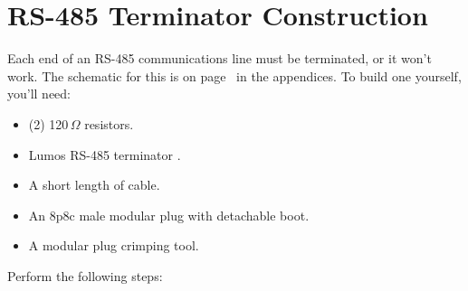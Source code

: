 \documentclass[letterpaper,twoside,onecolumn,openright,final]{memoir}
\begin{document}
\section{RS-485 Terminator Construction}\label{sec:terminator}
Each end of an RS-485 communications line must be terminated, or it won't work.
The schematic for this is on page~\pageref{sch:terminator} in the 
appendices.  To build one yourself, you'll need:
\begin{itemize}
\item	(2) 120\,$\Omega$ resistors.
\item	Lumos RS-485 terminator .
\item	A short length of  cable.
\item	An 8p8c male modular plug with detachable boot.
\item	A modular plug crimping tool.
\end{itemize}
Perform the following steps:
\end{document}

